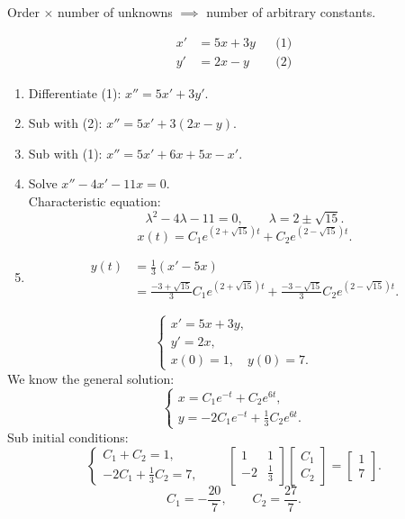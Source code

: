 \begin{thinking}
  Order $\times$ number of unknowns $\implies$ number of arbitrary constants.
\end{thinking}

\begin{example}
  \[
    \begin{aligned}
      x' & =5x+3y &  & \text{(1)} \\
      y' & =2x-y  &  & \text{(2)}
    \end{aligned}
  \]
  \begin{enumerate}
    \item Differentiate (1): $x''=5x'+3y'$.
    \item Sub with (2): $x''=5x'+3(2x-y)$.
    \item Sub with (1): $x''=5x'+6x+5x-x'$.
    \item Solve $x''-4x'-11x=0$.\\
          Characteristic equation:
          \[
            \lambda^2-4\lambda-11=0,\qquad\lambda=2\pm\sqrt{15}.
          \]
          \[
            x(t)=C_1e^{(2+\sqrt{15})t}+C_2e^{(2-\sqrt{15})t}.
          \]
    \item
          \begin{align*}
            y(t) & =\frac13(x'-5x)                            \\
                 & =\frac{-3+\sqrt{15}}3C_1e^{(2+\sqrt{15})t}
            +\frac{-3-\sqrt{15}}3C_2e^{(2-\sqrt{15})t}.
          \end{align*}
  \end{enumerate}
\end{example}

\begin{example}
  \[
    \begin{cases}
      x'=5x+3y, \\
      y'=2x,    \\
      x(0)=1,\quad y(0)=7.
    \end{cases}
  \]
  We know the general solution:
  \[
    \begin{cases}
      x=C_1e^{-t}+C_2e^{6t}, \\
      y=-2C_1e^{-t}+\frac13C_2e^{6t}.
    \end{cases}
  \]
  Sub initial conditions:
  \[
    \begin{cases}
      C_1+C_2=1, \\
      -2C_1+\frac13C_2=7,
    \end{cases}
    \qquad
    \begin{bmatrix}
      1 & 1 \\-2&\frac13
    \end{bmatrix}
    \begin{bmatrix}
      C_1 \\C_2
    \end{bmatrix}
    =
    \begin{bmatrix}
      1 \\7
    \end{bmatrix}
    .
  \]
  \[
    C_1=-\frac{20}7,\qquad C_2=\frac{27}7.
  \]
\end{example}

